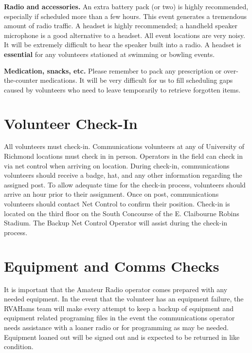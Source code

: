 \documentclass[pdflatex,letterpaper,twoside,12pt]{book}
\begin{document}
\textbf{Radio and accessories.}  An extra battery pack (or two) is highly recommended, especially if scheduled more than a few hours.  This event generates a tremendous amount of radio traffic.  A headset is highly recommended;  a handheld speaker microphone is a good alternative to a headset.  All event locations are very noisy.  It will be extremely difficult to hear the speaker built into a radio.  A headset is \textbf{essential} for any volunteers stationed at swimming or bowling events.

\textbf{Medication, snacks, etc.}  Please remember to pack any prescription or over-the-counter medications.  It will be very difficult for us to fill scheduling gaps caused by volunteers who need to leave temporarily to retrieve forgotten items.


\section{Volunteer Check-In}

All volunteers must check-in.  Communications volunteers at any of University of Richmond locations must check in in person.  Operators in the field can check in via net control when arriving on location.  During check-in, communications volunteers should receive a badge, hat, and any other information regarding the assigned post.  To allow adequate time for the check-in process, volunteers should arrive an hour prior to their assignment.  Once on post, communications volunteers should contact Net Control to confirm their position.  Check-in is located on the third floor on the South Concourse of the E. Claibourne Robins Stadium.  The Backup Net Control Operator will assist during the check-in process.


\section{Equipment and Comms Checks}

It is important that the Amateur Radio operator comes prepared with any needed equipment.  In the event that the volunteer has an equipment failure, the RVAHams team will make every attempt to keep a backup of equipment and equipment related programing files in the event the communications operator needs assistance with a loaner radio or for programming as may be needed.  Equipment loaned out will be signed out and is expected to be returned in like condition.
\end{document}
